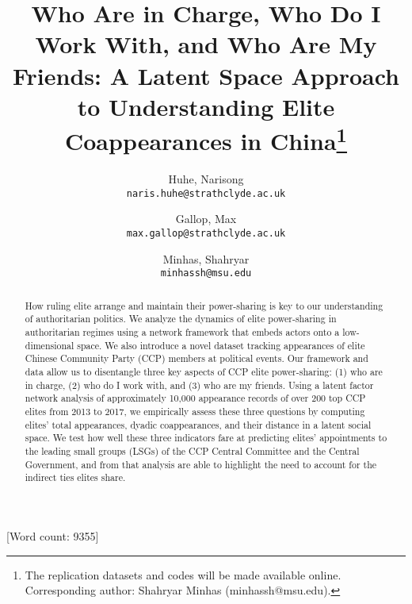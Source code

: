 \documentclass[11pt,english]{article}
\date{}
\begin{document}
\begin{spacing}{1}

\author{
  Huhe, Narisong\\
  \texttt{naris.huhe@strathclyde.ac.uk}
  \and
  Gallop, Max\\
  \texttt{max.gallop@strathclyde.ac.uk}
  \and
  Minhas, Shahryar\\
  \texttt{minhassh@msu.edu}
}

\title{\textbf{Who Are in Charge, Who Do I Work With, and Who Are My Friends:
A Latent Space Approach to Understanding Elite Coappearances in China}\thanks{The replication datasets and codes will be made available online. Corresponding author: Shahryar Minhas (minhassh@msu.edu).
}}


\maketitle
\begin{abstract}
\begin{flushleft}

How ruling elite arrange and maintain their power-sharing is key to our understanding of authoritarian politics. We analyze the dynamics of elite power-sharing in authoritarian regimes using a network framework that embeds actors onto a low-dimensional space. We also introduce a novel dataset tracking appearances of elite Chinese Community Party (CCP) members at political events. Our framework and data allow us to disentangle three key aspects of CCP elite power-sharing: (1) who are in charge, (2) who do I work with, and (3) who are my friends. Using a latent factor network analysis of approximately 10,000 appearance records of over 200 top CCP elites from 2013 to 2017, we empirically assess these three questions by computing elites' total appearances, dyadic coappearances, and their distance in a latent social space. We test how well these three indicators fare at predicting elites' appointments to the leading small groups (LSGs) of the CCP Central Committee and the Central Government, and from that analysis are able to highlight the need to account for the indirect ties elites share.

\end{flushleft}
\end{abstract}
\end{spacing}
[Word count: 9355]
\end{document}
